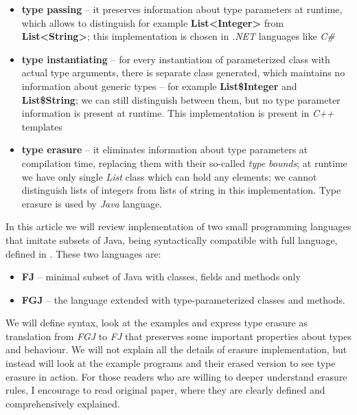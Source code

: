 \documentclass{article}[12pt]
\begin{document}
\begin{itemize}

\item{\textbf{type passing}} -- it preserves information about
  type parameters at runtime, which allows to distinguish
  for example \textbf{List<Integer>} from \textbf{List<String>}; 
  this implementation is chosen in \emph{.NET} languages like
  \emph{C\#}

\item{\textbf{type instantiating}} -- for every instantiation of
  parameterized class with actual type arguments, there is separate
  class generated, which maintains no information about generic
  types -- for example \textbf{List\$Integer} and \textbf{List\$String};
  we can still distinguish between them, but no type parameter
  information is present at runtime. This implementation is present
  in \emph{C++} templates

\item{\textbf{type erasure}} -- it eliminates information about
  type parameters at compilation time, replacing them with their
  so-called \emph{type bounds}; at runtime we have only single
  \emph{List} class which can hold any elements; we cannot
  distinguish lists of integers from lists of string in this
  implementation. Type erasure is used by \emph{Java} language.

\end{itemize}


In this article we will review implementation of two small
programming languages that imitate subsets of Java, being
syntactically compatible with full language, defined in
\cite{fj}. These two languages are:

\begin{itemize}
\item{\textbf{FJ}} -- minimal subset of Java with classes,
fields and methods only
\item{\textbf{FGJ}} -- the language extended with
type-parameterized classes and methods.
\end{itemize}


We will define syntax, look at the examples and express type
erasure as translation from \emph{FGJ} to \emph{FJ} that
preserves some important properties about types and behaviour.
We will not explain all the details of erasure implementation,
but instead will look at the example programs and their erased
version to see type erasure in action. For those readers who
are willing to deeper understand erasure rules, I encourage
to read original paper, where they are clearly defined and
comprehensively explained.
\end{document}
